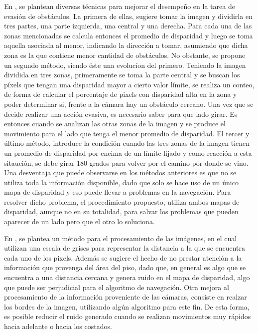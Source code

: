 \documentclass[journal]{IEEEtran}
\begin{document}
En \cite{KNG10}, se plantean diversas t\'ecnicas para mejorar el desempe\~no en la tarea de evasi\'on de obst\'aculos. La primera de ellas, sugiere tomar la imagen y dividirla en tres partes, una parte izquierda, una central y una derecha. Para cada una de las zonas mencionadas se calcula entonces el promedio de disparidad y luego se toma aquella asociada al menor, indicando la direcci\'on a tomar, asumiendo que dicha zona es la que contiene menor cantidad de obst\'aculos. No obstante, se propone un segundo m\'etodo, siendo \'este una evoluc\'ion del primero. Teniendo la imagen dividida en tres zonas, primeramente se toma la parte central y se buscan los p\'ixels que tengan una disparidad mayor a cierto valor l\'imite, se realiza un conteo, de forma de calcular el porcentaje de pixels con disparidad alta en la zona y poder determinar si, frente a la c\'amara hay un obst\'aculo cercano.
Una vez que se decide realizar una acci\'on evasiva, es necesario saber para que lado girar. Es entonces cuando se analizan las otras zonas de la imagen y se produce el movimiento para el lado que tenga el menor promedio de disparidad. El tercer y \'ultimo m\'etodo, introduce la condici\'on cuando las tres zonas de la imagen tienen un promedio de disparidad por encima de un l\'imite fijado y como reacci\'on a esta sitauci\'on, se debe girar 180 grados para volver por el camino por donde se vino. Una desventaja que puede observarse en los m\'etodos anteriores es que no se utiliza toda la informaci\'on disponible, dado que solo se hace uso de un \'unico mapa de disparidad y eso puede llevar a problemas en la navegaci\'on. Para resolver dicho problema, el procedimiento propuesto, utiliza ambos mapas de disparidad, aunque no en su totalidad, para salvar los problemas que pueden aparecer de un lado pero que el otro lo soluciona.

En \cite{RH04}, se plantea un m\'etodo para el procesamiento de las im\'agenes, en el cual utilizan una escala de grises para representar la distancia a la que se encuentra cada uno de los pixels. Adem\'as se sugiere el hecho de no prestar atenci\'on a la informaci\'on que provenga del \'area del piso, dado que, en general es algo que se encuentra a una distancia cercana y genera ruido en el mapa de disparidad, algo que puede ser perjudicial para el algoritmo de navegaci\'on. Otra mejora al procesamiento de la informaci\'on proveniente de las c\'amaras, consiste en realzar los bordes de la imagen, utilizando alg\'un algoritmo para este fin. De esta forma, es posible reducir el ruido generado cuando se realizan movimientos muy r\'apidos hacia adelante o hacia los costados.
\end{document}
